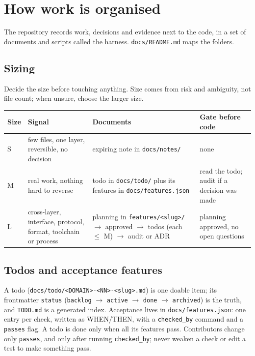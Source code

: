 \documentclass[11pt,a4paper]{article}
\newcommand{\code}[1]{\texttt{#1}}
\newcommand{\file}[1]{\texttt{#1}}
\begin{document}
\section{How work is organised}\label{sec:process}

The repository records work, decisions and evidence next to the code, in a set of documents and
scripts called the harness. \file{docs/README.md} maps the folders.

\subsection{Sizing}

Decide the size before touching anything. Size comes from risk and ambiguity, not file count; when
unsure, choose the larger size.

\begin{center}
\small
\begin{tabularx}{\textwidth}{@{}l X X X@{}}
\toprule
\textbf{Size} & \textbf{Signal} & \textbf{Documents} & \textbf{Gate before code} \\
\midrule
S & few files, one layer, reversible, no decision & expiring note in \file{docs/notes/} & none \\
M & real work, nothing hard to reverse & todo in \file{docs/todo/} plus its features in
    \file{docs/features.json} & read the todo; audit if a decision was made \\
L & cross-layer, interface, protocol, format, toolchain or process & planning in
    \file{features/<slug>/} $\to$ approved $\to$ todos (each $\leq$ M) $\to$ audit or ADR &
    planning approved, no open questions \\
\bottomrule
\end{tabularx}
\end{center}

\subsection{Todos and acceptance features}

A todo (\file{docs/todo/<DOMAIN>-<NN>-<slug>.md}) is one doable item; its frontmatter
\code{status} (\code{backlog} $\to$ \code{active} $\to$ \code{done} $\to$ \code{archived}) is the
truth, and \file{TODO.md} is a generated index. Acceptance lives in \file{docs/features.json}: one
entry per check, written as WHEN/THEN, with a \code{checked\_by} command and a \code{passes} flag. A
todo is done only when all its features pass. Contributors change only \code{passes}, and only after
running \code{checked\_by}; never weaken a check or edit a test to make something pass.
\end{document}
